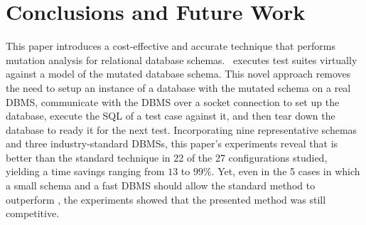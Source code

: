 
\section{Conclusions and Future Work}
\label{sec:conclusions}


This paper introduces a cost-effective and accurate technique that performs mutation analysis for relational database schemas. \Vma~executes test suites virtually against a model of the mutated database schema. This novel approach removes the need to setup an instance of a database with the mutated schema on a real DBMS, communicate with the DBMS over a socket connection to set up the database, execute the SQL \INSERTs of a test case against it, and then tear down the database to ready it for the next test. Incorporating nine representative schemas and three industry-standard DBMSs, this paper's experiments reveal that \vma is better than the standard technique in 22 of the 27 configurations studied, yielding a time savings ranging from $13$ to $99\%$. Yet, even in the 5 cases in which a small schema and a fast DBMS should allow the standard method to outperform \vma, the experiments showed that the presented method was still competitive.





